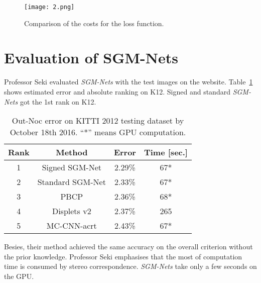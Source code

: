 \documentclass[twocolumn]{article}
\begin{document}
    \begin{figure}[ht]
    	\centering
    	\texttt{[image: 2.png]}
    	\caption{Comparison of the costs for the loss function.}\label{costs}
    \end{figure}

    \section{Evaluation of SGM-Nets}
    Professor Seki evaluated \emph{SGM-Nets} with the test images on the website. Table~\ref{table1} shows estimated error and absolute ranking on K12. Signed and standard \emph{SGM-Nets} got the 1st rank on K12. 

	\begin{table}[htbp]
		\centering
		\caption{Out-Noc error on KITTI 2012 testing dataset by October
			18th 2016. ``*'' means GPU computation.}\label{table1}
		\begin{tabular}{|c|c|c|c|}
			\hline
		     Rank & Method & Error & Time [sec.] \\
			\hline
			1 & Signed SGM-Net & 2.29\% & 67* \\
			\hline
			2 & Standard SGM-Net & 2.33\% & 67* \\
			\hline
			3 & PBCP\cite{Seki2016Patch} & 2.36\% & 68* \\
			\hline
			4 & Displets v2 \cite{Guney2015Displets}  & 2.37\% & 265 \\
			\hline
			5 & MC-CNN-acrt \cite{Lecun2015Stereo} & 2.43\% & 67* \\
			\hline
		\end{tabular}
	\end{table}
    Besies, their method achieved the same accuracy on the overall criterion without the prior knowledge. Professor Seki emphasises that the most of computation time is consumed by stereo correspondence. \emph{SGM-Nets} take only a few seconds on the GPU.


	
\end{document}

